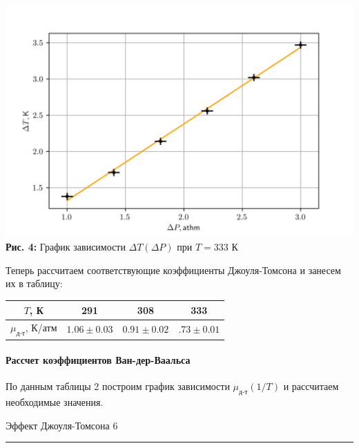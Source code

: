 \documentclass[12pt,a4paper]{scrartcl}
\begin{document}
	\begin{center}
		\includegraphics[scale=0.8]{PIC_2.png}
		\\\textbf{Рис. 4:} График зависимости $\Delta T (\Delta P)$ при $T = 333$ К
	\end{center}

	Теперь рассчитаем соответствующие коэффициенты Джоуля-Томсона и занесем их в таблицу:
	
	\begin{center}
		\begin{tabular}{|c|c|c|c|}
			\hline
			$T$, К & 291 & 308 & 333
			\\\hline
			$\mu_{\text{д-т}}$, К/атм & $1.06 \pm 0.03$ & $0.91 \pm 0.02$ & $.73 \pm 0.01$
			\\\hline
		\end{tabular}
	\end{center}

	\paragraph{Рассчет коэффициентов Ван-дер-Ваальса} \hfill

	По данным таблицы 2 построим график зависимости $\mu_{\text{д-т}}(1/T)$ и рассчитаем необходимые значения.
	
	\newpage 
	
	
	\begin{flushleft}
		\footnotesize{Эффект Джоуля-Томсона} \hspace{\fill} \footnotesize{6}
		\\[-0.3cm]\noindent\rule{\textwidth}{0.3pt}
	\end{flushleft}
	
\end{document}
